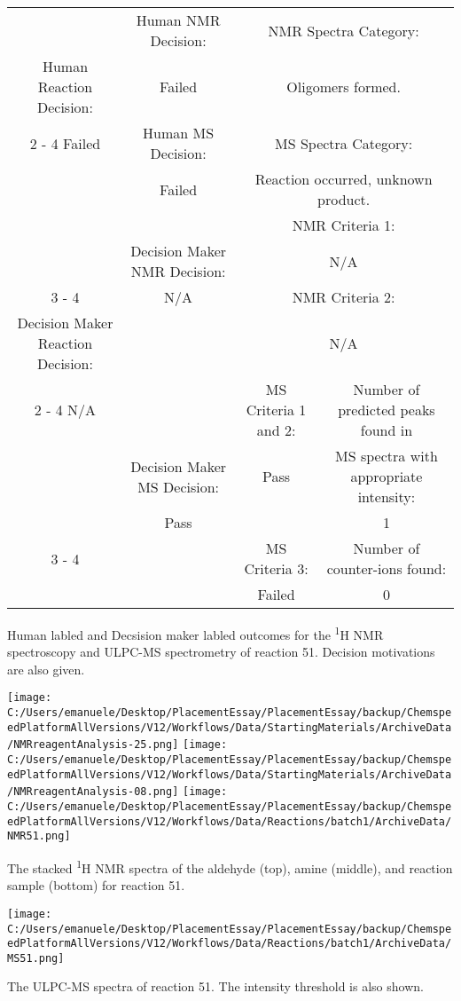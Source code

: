 \documentclass{article}%
\begin{document}
\begin{Decision Table}[H]%
\begin{tabular}{|c|c|c|c|}%
\hline%
&Human NMR Decision:&\multicolumn{2}{|c|}{NMR Spectra Category:}\\%
Human Reaction Decision:&Failed&\multicolumn{2}{|c|}{Oligomers formed.}\\%
\cline{2%
-%
4}%
Failed&Human MS Decision:&\multicolumn{2}{|c|}{MS Spectra Category:}\\%
&Failed&\multicolumn{2}{|c|}{Reaction occurred, unknown product.}\\%
\hline%
&&\multicolumn{2}{|c|}{NMR Criteria 1:}\\%
&Decision Maker NMR Decision:&\multicolumn{2}{|c|}{N/A}\\%
\cline{3%
-%
4}%
&N/A&\multicolumn{2}{|c|}{NMR Criteria 2:}\\%
Decision Maker Reaction Decision:&&\multicolumn{2}{|c|}{N/A}\\%
\cline{2%
-%
4}%
N/A&&MS Criteria 1 and 2:&Number of predicted peaks found in\\%
&Decision Maker MS Decision:&Pass&MS spectra with appropriate intensity:\\%
&Pass&&1\\%
\cline{3%
-%
4}%
&&MS Criteria 3:&Number of counter{-}ions found:\\%
&&Failed&0\\%
\hline%
\end{tabular}%
\caption{Human labled and Decsision maker labled outcomes for the \textsuperscript{1}H NMR spectroscopy and ULPC-MS spectrometry of reaction 51. Decision motivations are also given.}%
\end{Decision Table}%
\begin{NMR Spectra}[H]%
\begin{center}%
\texttt{[image: C:/Users/emanuele/Desktop/PlacementEssay/PlacementEssay/backup/ChemspeedPlatformAllVersions/V12/Workflows/Data/StartingMaterials/ArchiveData/NMRreagentAnalysis-25.png]}\hfill%
\texttt{[image: C:/Users/emanuele/Desktop/PlacementEssay/PlacementEssay/backup/ChemspeedPlatformAllVersions/V12/Workflows/Data/StartingMaterials/ArchiveData/NMRreagentAnalysis-08.png]}\hfill%
\texttt{[image: C:/Users/emanuele/Desktop/PlacementEssay/PlacementEssay/backup/ChemspeedPlatformAllVersions/V12/Workflows/Data/Reactions/batch1/ArchiveData/NMR51.png]}\hfill%
\end{center}%
\caption{The stacked \textsuperscript{1}H NMR spectra of the aldehyde (top), amine (middle), and reaction sample (bottom) for reaction 51.}%
\end{NMR Spectra}%
\begin{MS Spectra}[H]%
\begin{center}%
\texttt{[image: C:/Users/emanuele/Desktop/PlacementEssay/PlacementEssay/backup/ChemspeedPlatformAllVersions/V12/Workflows/Data/Reactions/batch1/ArchiveData/MS51.png]}\hfill%
\end{center}%
\caption{The ULPC-MS spectra of reaction 51. The intensity threshold is also shown.}%
\end{MS Spectra}%
\end{document}
